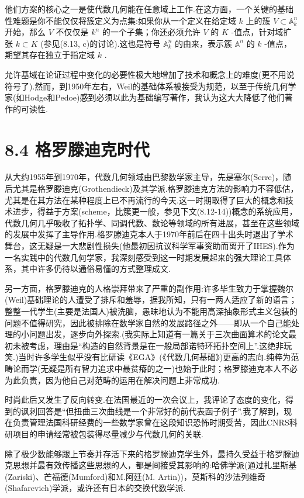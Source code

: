 他们方案的核心之一是使代数几何能在任意域上工作.在这方面，一个关键的基础性难题是你不能仅仅将簇定义为点集:如果你从一个定义在给定域 \(k\) 上的簇 \(V \subset  {\mathbb{A}}_{k}^{n}\) 开始，那么 \(V\) 不仅仅是 \({k}^{n}\) 的一个子集；你还必须允许 \(V\) 的 \(K\) -值点，针对域扩张 \(k \subset  K\) (参见(8.13, c)的讨论).这也是符号 \({\mathbb{A}}_{k}^{n}\) 的由来，表示簇 \({\mathbb{A}}^{n}\) 的 \(k\) -值点，期望其存在独立于指定域 \(k\) .

允许基域在论证过程中变化的必要性极大地增加了技术和概念上的难度(更不用说符号了).然而，到1950年左右，Weil的基础体系被接受为规范，以至于传统几何学家(如Hodge和Pedoe)感到必须以此为基础编写著作，我认为这大大降低了他们著作的可读性.

\section{8.4 格罗滕迪克时代}

从大约1955年到1970年，代数几何领域由巴黎数学家主导，先是塞尔(Serre)，随后尤其是格罗滕迪克(Grothendieck)及其学派.格罗滕迪克方法的影响力不容低估，尤其是在其方法在某种程度上已不再流行的今天.这一时期取得了巨大的概念和技术进步，得益于方案(scheme，比簇更一般，参见下文(8.12-14))概念的系统应用，代数几何几乎吸收了拓扑学、同调代数、数论等领域的所有进展，甚至在这些领域的发展中发挥了主导作用.格罗滕迪克本人于1970年前后在四十出头时退出了学术舞台，这无疑是一大悲剧性损失(他最初因抗议科学军事资助而离开了IHES).作为一名实践中的代数几何学家，我深刻感受到这一时期发展起来的强大理论工具体系，其中许多仍待以通俗易懂的方式整理成文.

另一方面，格罗滕迪克的人格崇拜带来了严重的副作用:许多毕生致力于掌握魏尔(Weil)基础理论的人遭受了排斥和羞辱，据我所知，只有一两人适应了新的语言；整整一代学生(主要是法国人)被洗脑，愚昧地认为不能用高深抽象形式主义包装的问题不值得研究，因此被排除在数学家自然的发展路径之外——即从一个自己能处理的小问题出发，逐步向外探索.(我实际上知道有一篇关于三次曲面算术的论文最初未被考虑，理由是“构造的自然背景是在一般局部诺特环拓扑空间上”.这绝非玩笑.)当时许多学生似乎没有比研读《EGA》(《代数几何基础》)更高的志向.纯粹为范畴论而学(无疑是所有智力追求中最贫瘠的之一)也始于此时；格罗滕迪克本人不必为此负责，因为他自己对范畴的运用在解决问题上非常成功.

时尚此后又发生了反向转变.在法国最近的一次会议上，我评论了态度的变化，得到的讽刺回答是“但扭曲三次曲线是一个非常好的前代表函子例子”.我了解到，现在负责管理法国科研经费的一些数学家曾在这段知识恐怖时期受苦，因此CNRS科研项目的申请经常被包装得尽量减少与代数几何的关联.

除了极少数能够跟上节奏并存活下来的格罗滕迪克学生外，最持久受益于格罗滕迪克思想并最有效传播这些思想的人，都是间接受其影响的:哈佛学派(通过扎里斯基(Zariski)、芒福德(Mumford)和M.阿廷(M. Artin))，莫斯科的沙法列维奇(Shafarevich)学派，或许还有日本的交换代数学派.

